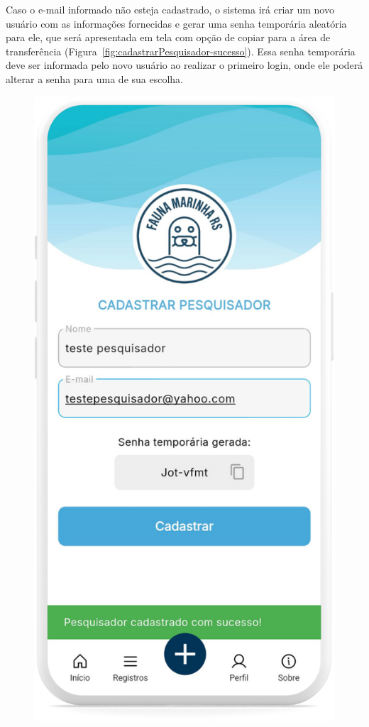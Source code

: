 Caso o e-mail informado não esteja cadastrado, o sistema irá criar um novo usuário com as informações 
fornecidas e gerar uma senha temporária aleatória para ele, que será apresentada em tela com opção de 
copiar para a área de transferência (Figura~\ref{fig:cadastrarPesquisador-sucesso}).
Essa senha temporária deve ser informada pelo novo usuário ao realizar o primeiro login, onde ele poderá 
alterar a senha para uma de sua escolha.

\begin{figure}[H]
    \centering
    \begin{minipage}[t]{0.48\textwidth}
        \centering
        \includegraphics[height=0.72\textheight]{imagens/sistema/device_frame/cadastrarPesqSucesso.png}

\end{minipage}
\end{figure}
